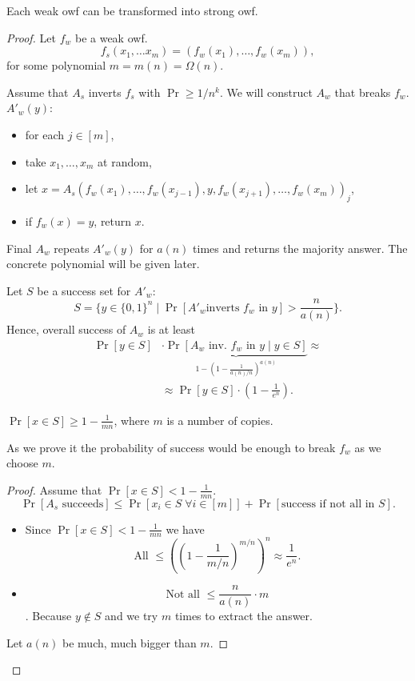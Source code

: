 \begin{theorem}
    Each weak owf can be transformed into strong owf.
\end{theorem}
\begin{proof}
    Let $f_w$ be a weak owf.
    \[
        f_s(x_1, \ldots x_m) = (f_w(x_1), \ldots, f_w(x_m)),
    \]
    for some polynomial $m = m(n) = \Omega(n)$.

    Assume that $A_s$ inverts $f_s$ with $\Pr \geq 1/n^k$.
    We will construct $A_w$ that breaks $f_w$.
    $A'_w(y)$:
    \begin{itemize}
        \item for each $j \in [m]$,
        \item take $x_1, \ldots, x_m$ at random,
        \item let $x = A_s(f_w(x_1), \ldots, f_w(x_{j - 1}), y, f_w(x_{j + 1}), \ldots, f_w(x_m))_j$,
        \item if $f_w(x) = y$, return $x$.
    \end{itemize}
    Final $A_w$ repeats $A'_w(y)$ for $a(n)$ times and returns the majority answer.
    The concrete polynomial will be given later.

    Let $S$ be a success set for $A'_w$:
    \[
        S = \{y \in \{0, 1\}^n \mid \Pr[A'_w \text {inverts } f_w \text{ in } y] > \frac n {a(n)}\}.
    \]
    Hence, overall success of $A_w$ is at least
    \begin{align*}
        \Pr[y \in S] &\cdot \underbrace{\Pr[A_w \text{ inv. } f_w \text{ in } y \mid y \in S]}_{1 - (1 - \frac 1 {a(n) / n})^{a(n)}} \approx \\
        &\approx \Pr[y \in S] \cdot \left(1 - \frac 1 {e^n}\right).
    \end{align*}
    \begin{claim}
        $\Pr[x \in S] \geq 1 - \frac 1 {mn}$, where $m$ is a number of copies.
    \end{claim}
    As we prove it the probability of success would be enough to break $f_w$ as we choose $m$.
    \begin{proof}
        Assume that $\Pr[x \in S] < 1 - \frac 1 {mn}$.
        \[
            \Pr[A_s \text{ succeeds}] \leq \Pr[x_i \in S \; \forall i \in [m]] + \Pr[\text{success if not all in } S].
        \]
        \begin{itemize}
            \item Since $\Pr[x \in S] < 1 - \frac 1 {mn}$ we have \[
                      \text{All } \leq ((1 - \frac 1 {m/n})^{m/n})^n \approx \frac 1 {e^n}.
            \]
            \item \[\text{Not all } \leq \frac n {a(n)} \cdot m\].
            Because $y \not \in S$ and we try $m$ times to extract the answer.
        \end{itemize}
        Let $a(n)$ be much, much bigger than $m$.
    \end{proof}

\end{proof}

